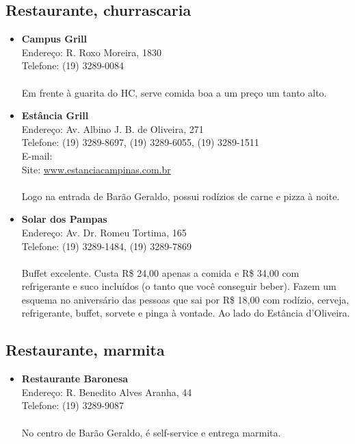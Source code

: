 \subsection{Restaurante, churrascaria}

\begin{itemize}
\item \textbf{Campus Grill}
  \\Endereço: R. Roxo Moreira, 1830
  \\Telefone: (19) 3289-0084
  \\
  \\Em frente à guarita do HC, serve comida boa a um preço um tanto alto.

\item \textbf{Estância Grill}
  \\Endereço: Av. Albino J. B. de Oliveira, 271
  \\Telefone: (19) 3289-8697, (19) 3289-6055, (19) 3289-1511
  \\E-mail: 
  \\Site: \url{www.estanciacampinas.com.br}
  \\
  \\Logo na entrada de Barão Geraldo, possui rodízios de carne e pizza à noite.

\item \textbf{Solar dos Pampas}
  \\Endereço: Av. Dr. Romeu Tortima, 165
  \\Telefone: (19) 3289-1484, (19) 3289-7869
  \\
  \\Buffet excelente. Custa R\$ 24,00 apenas a comida e R\$ 34,00 com
  refrigerante e suco incluídos (o tanto que você conseguir beber). Fazem um
  esquema no aniversário das pessoas que sai por R\$ 18,00 com rodízio,
  cerveja, refrigerante, buffet, sorvete e pinga à vontade. Ao lado do Estância
  d'Oliveira.
\end{itemize}

\subsection{Restaurante, marmita}

\begin{itemize}
\item \textbf{Restaurante Baronesa}
  \\Endereço: R. Benedito Alves Aranha, 44
  \\Telefone: (19) 3289-9087
  \\
  \\No centro de Barão Geraldo, é self-service e entrega marmita.
\end{itemize}

